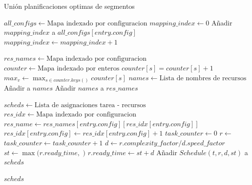 \begin{algorithm}
\caption{Uni\'on planificaciones optimas de segmentos}
\label{alg_blind_merge}
\begin{algorithmic}[1]
	\State $all\_configs \gets \text{Mapa indexado por configuracion}$
	\State $mapping\_index \gets 0$
        	\State Añadir $mapping\_index$ a $all\_configs[entry.config]$
        \EndFor
        \State $mapping\_index \gets mapping\_index + 1$
    \EndFor

    \State $res\_names \gets \text{Mapa indexado por configuracion}$
    	\State $counter \gets \text{Mapa indexado por enteros}$
			\State $counter[s] = counter[s] + 1$
    	\EndFor
    	\State ${max}_v \gets \max_{s \in counter.keys()} {counter[s]}$
    	\State $names \gets \text{Lista de nombres de recursos}$
    		\State Añadir  a $names$ 
    	\EndFor
    	\State Añadir $names$ a $res\_names$
    \EndFor

	\State $scheds \gets \text{Lista de asignaciones tarea - recursos}$
		\State $res\_idx \gets \text{Mapa indexado por configuracion}$
        	\State $res\_name \gets res\_names[ entry.config ] [ res\_idx[entry.config] ]$
        	\State $res\_idx[entry.config] \gets res\_idx[entry.config] + 1$
        	\State $task\_counter \gets 0$
        		\State $r \gets$ 
        		\State $task\_counter \gets task\_counter + 1$
        		\State $d \gets r.complexity\_factor / d.speed\_factor$
        		\State $st \gets \max(r.ready\_time,$ $)$
        		\State $r.ready\_time \gets st + d$
        		\State Añadir $Schedule(t, r, d, st)$ a $scheds$
        	\EndFor
        \EndFor
    \EndFor

    \State \Return $scheds$
\EndProcedure
\end{algorithmic}
\end{algorithm}


